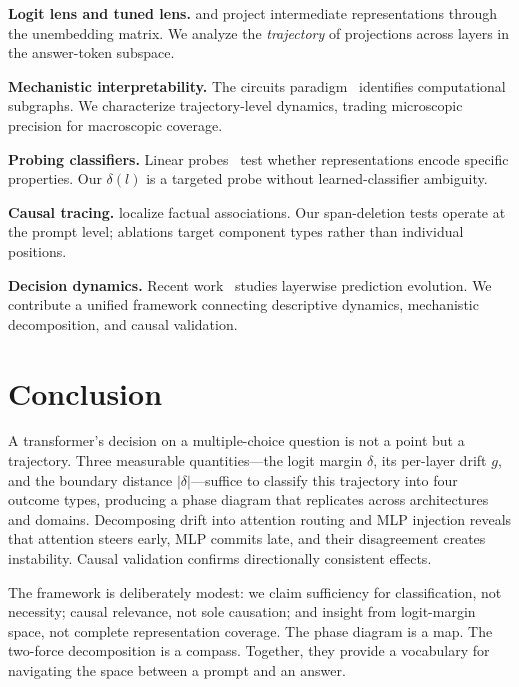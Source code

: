 \documentclass{article}
\begin{document}
\textbf{Logit lens and tuned lens.}  \citet{nostalgebraist2020} and \citet{belrose2023} project intermediate representations through the unembedding matrix.  We analyze the \emph{trajectory} of projections across layers in the answer-token subspace.

\textbf{Mechanistic interpretability.}  The circuits paradigm~\cite{elhage2021,olsson2022,conmy2023} identifies computational subgraphs.  We characterize trajectory-level dynamics, trading microscopic precision for macroscopic coverage.

\textbf{Probing classifiers.}  Linear probes~\cite{belinkov2022,hewitt2019} test whether representations encode specific properties.  Our $\delta(l)$ is a targeted probe without learned-classifier ambiguity.

\textbf{Causal tracing.}  \citet{meng2022} localize factual associations.  Our span-deletion tests operate at the prompt level; ablations target component types rather than individual positions.

\textbf{Decision dynamics.}  Recent work~\cite{din2023,geva2023} studies layerwise prediction evolution.  We contribute a unified framework connecting descriptive dynamics, mechanistic decomposition, and causal validation.


\section{Conclusion}

A transformer's decision on a multiple-choice question is not a point but a trajectory.  Three measurable quantities---the logit margin $\delta$, its per-layer drift $g$, and the boundary distance $|\delta|$---suffice to classify this trajectory into four outcome types, producing a phase diagram that replicates across architectures and domains.  Decomposing drift into attention routing and MLP injection reveals that attention steers early, MLP commits late, and their disagreement creates instability.  Causal validation confirms directionally consistent effects.

The framework is deliberately modest: we claim sufficiency for classification, not necessity; causal relevance, not sole causation; and insight from logit-margin space, not complete representation coverage.  The phase diagram is a map.  The two-force decomposition is a compass.  Together, they provide a vocabulary for navigating the space between a prompt and an answer.
\end{document}
